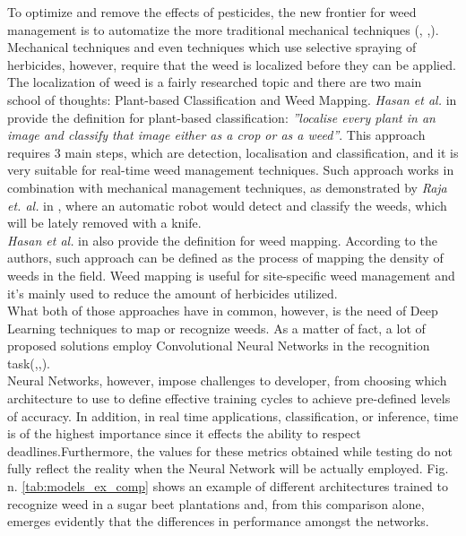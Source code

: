 To optimize and remove the effects of pesticides, the new frontier for weed management is to automatize the more traditional mechanical techniques (\cite{raja_real-time_2020}, \cite{frasconi_design_2014},\cite{machleb_sensor-based_2021}).\\
Mechanical techniques and even techniques which use selective spraying of herbicides, however, require that the weed is localized before they can be applied. The localization of weed is a fairly researched topic and there are two main school of thoughts: Plant-based Classification and Weed Mapping. 
\textit{Hasan et al.} in \cite{hasan_survey_2021} provide the definition for plant-based classification: \textit{''localise every plant in an image and classify that image either as a crop or as a weed''}. This approach requires 3 main steps, which are detection, localisation and classification, and it is very suitable for real-time weed management techniques. \cite{hasan_survey_2021} 
Such approach works in combination with mechanical management techniques, as demonstrated by \textit{Raja et. al.} in \cite{raja_real-time_2020}, where an automatic robot would detect and classify the weeds, which will be lately removed with a knife.\\
\textit{Hasan et al.} in \cite{hasan_survey_2021} also provide the definition for weed mapping. According to the authors, such approach can be defined as the process of mapping the density of weeds in the field.
Weed mapping is useful for site-specific weed management and it’s mainly used to reduce the amount of herbicides utilized. \cite{hasan_survey_2021} \\
What both of those approaches have in common, however, is the need of Deep Learning techniques to map or recognize weeds. As a matter of fact, a lot of proposed solutions employ Convolutional Neural Networks in the recognition task(\cite{gao_deep_2020},\cite{suh_transfer_2018},\cite{ramirez_deep_2020}).\\
Neural Networks, however, impose challenges to developer, from choosing which architecture to use to define effective training cycles to achieve pre-defined levels of accuracy. In addition, in real time applications, classification, or inference, time is of the highest importance since it effects the ability to respect deadlines.Furthermore, the values for these metrics obtained while testing do not fully reflect the reality when the Neural Network will be actually employed. Fig. n. \ref{tab:models_ex_comp} shows an example of different architectures trained to recognize weed in a sugar beet plantations and, from this comparison alone, emerges evidently that the differences in performance amongst the networks.\\ 
